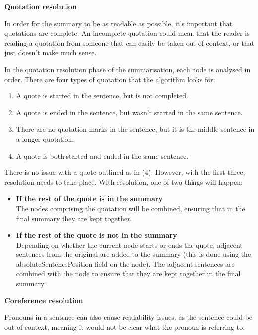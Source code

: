 \documentclass[12pt]{article}
\begin{document}
\textbf{Quotation resolution}

In order for the summary to be as readable as possible, it's important that quotations are complete. An incomplete quotation could mean that the reader is reading a quotation from someone that can easily be taken out of context, or that just doesn't make much sense.

In the quotation resolution phase of the summarisation, each node is analysed in order. There are four types of quotation that the algorithm looks for:

\begin{enumerate}
	\item A quote is started in the sentence, but is not completed.
	\item A quote is ended in the sentence, but wasn't started in the same sentence.
	\item There are no quotation marks in the sentence, but it is the middle sentence in a longer quotation.
	\item A quote is both started and ended in the same sentence.
\end{enumerate}

There is no issue with a quote outlined as in (4). However, with the first three, resolution needs to take place. With resolution, one of two things will happen:

\begin{itemize}
	\item \textbf{If the rest of the quote is in the summary} \\ The nodes comprising the quotation will be combined, ensuring that in the final summary they are kept together. \\
	\item \textbf{If the rest of the quote is not in the summary} \\ Depending on whether the current node starts or ends the quote, adjacent sentences from the original are added to the summary (this is done using the absoluteSentencePosition field on the node). The adjacent sentences are combined with the node to ensure that they are kept together in the final summary. \\
\end{itemize}

\textbf{Coreference resolution}

Pronouns in a sentence can also cause readability issues, as the sentence could be out of context, meaning it would not be clear what the pronoun is referring to.
\end{document}
